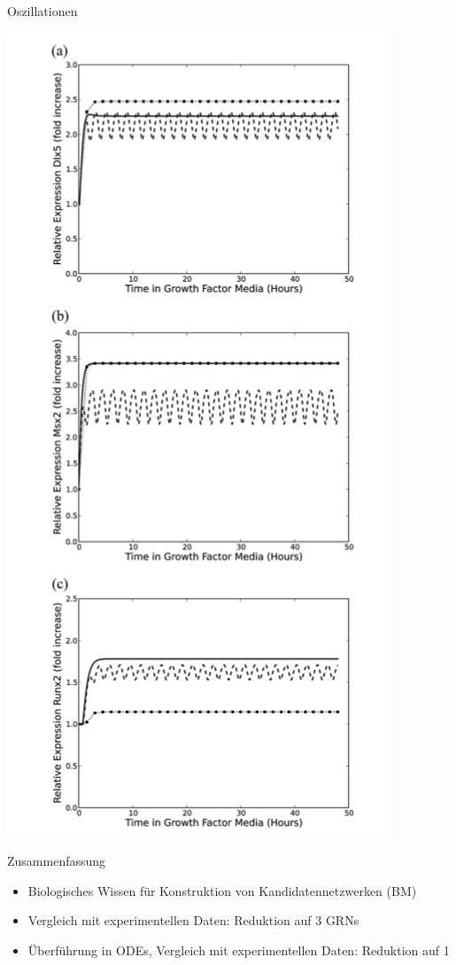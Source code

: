 \documentclass[]{beamer}
\begin{document}
\begin{frame}{Oszillationen}
\begin{center}
	\includegraphics[scale=0.20]{oscillations.jpg}
\end{center}
\end{frame}

\begin{frame}{Zusammenfassung}
\begin{itemize}
	\item Biologisches Wissen f\"ur Konstruktion von Kandidatennetzwerken (BM)
	\pause
	\item Vergleich mit experimentellen Daten: Reduktion auf 3 GRNs
	\pause
	\item \"Uberf\"uhrung in ODEs, Vergleich mit experimentellen Daten: Reduktion auf 1
\end{itemize}
\end{frame}
\end{document}
